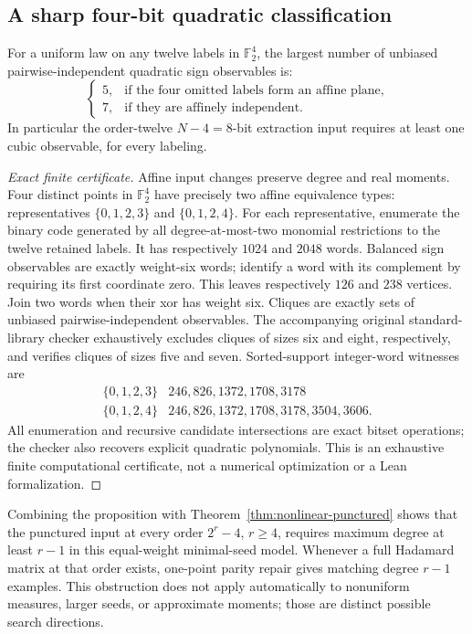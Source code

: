 \subsection{A sharp four-bit quadratic classification}
\begin{proposition}\label{prop:nonlinear-twelve-classification}
For a uniform law on any twelve labels in $\mathbb F_2^4$, the largest
number of unbiased pairwise-independent quadratic sign observables is:
\[
 \begin{cases}
 5,&\text{if the four omitted labels form an affine plane},\\
 7,&\text{if they are affinely independent}.
 \end{cases}
\]
In particular the order-twelve $N-4=8$-bit extraction input requires
at least one cubic observable, for every labeling.
\end{proposition}
\begin{proof}[Exact finite certificate]
Affine input changes preserve degree and real moments. Four distinct
points in $\mathbb F_2^4$ have precisely two affine equivalence types:
representatives $\{0,1,2,3\}$ and $\{0,1,2,4\}$.
For each representative, enumerate the binary code generated by all
degree-at-most-two monomial restrictions to the twelve retained labels.
It has respectively $1024$ and $2048$ words. Balanced sign observables
are exactly weight-six words; identify a word with its complement by
requiring its first coordinate zero. This leaves respectively $126$
and $238$ vertices. Join two words when their xor has weight six.
Cliques are exactly sets of unbiased pairwise-independent observables.
The accompanying original standard-library checker exhaustively excludes
cliques of sizes six and eight, respectively, and verifies cliques of
sizes five and seven. Sorted-support integer-word witnesses are
\[
 \begin{array}{c|l}
 \{0,1,2,3\}&246,826,1372,1708,3178\\
 \{0,1,2,4\}&246,826,1372,1708,3178,3504,3606.
 \end{array}
\]
All enumeration and recursive candidate intersections are exact bitset
operations; the checker also recovers explicit quadratic polynomials.
This is an exhaustive finite computational certificate, not a numerical
optimization or a Lean formalization.
\end{proof}
Combining the proposition with Theorem~\ref{thm:nonlinear-punctured}
shows that the punctured input at every order $2^r-4$, $r\ge4$, requires
maximum degree at least $r-1$ in this equal-weight minimal-seed model.
Whenever a full Hadamard matrix at that order exists, one-point parity
repair gives matching degree $r-1$ examples. This obstruction does not
apply automatically to nonuniform measures, larger seeds, or approximate
moments; those are distinct possible search directions.

